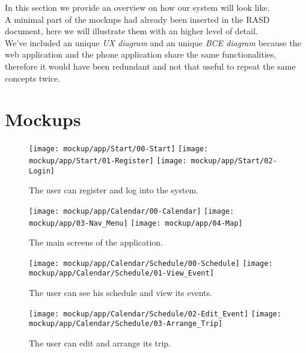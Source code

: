 In this section we provide an overview on how our system will look like.\\
A minimal part of the mockups had already been inserted in the RASD document, here we will illustrate them with an higher level of detail.\\
We've included an unique \textit{UX diagram} and an unique \textit{BCE diagram} because the web application and the phone application share the same functionalities, therefore it would have been redundant and not that useful to repeat the same concepts twice.


\section{Mockups}
\label{subsect:Mockups}
	\begin{figure}[H]
		\texttt{[image: mockup/app/Start/00-Start]}
		\hspace{.3cm}
		\texttt{[image: mockup/app/Start/01-Register]}
		\hspace{.3cm}
		\texttt{[image: mockup/app/Start/02-Login]}
		\centering
		\caption{The user can register and log into the system.}
	\end{figure}
	
	\begin{figure}[H]
		\texttt{[image: mockup/app/Calendar/00-Calendar]}
		\hspace{.3cm}
		\texttt{[image: mockup/app/03-Nav\_Menu]}
		\hspace{.3cm}
		\texttt{[image: mockup/app/04-Map]}
		\centering
		\caption{The main screens of the application.}
	\end{figure}

	\begin{figure}[H]
		\texttt{[image: mockup/app/Calendar/Schedule/00-Schedule]}
		\hspace{.3cm}
		\texttt{[image: mockup/app/Calendar/Schedule/01-View\_Event]}
		\centering 
		\caption{The user can see his schedule and view its events.}
	\end{figure}
	
	\begin{figure}[H]
		\texttt{[image: mockup/app/Calendar/Schedule/02-Edit\_Event]}
		\hspace{.3cm}
		\texttt{[image: mockup/app/Calendar/Schedule/03-Arrange\_Trip]}
		\centering 
		\caption{The user can edit and arrange its trip.}
	\end{figure}
	
